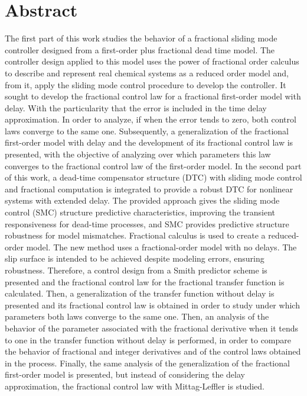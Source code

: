\documentclass[a4paper, 12pt]{report}
\begin{document}
\chapter*{Abstract}

The first part of this work studies the behavior of a fractional sliding mode controller designed from a first-order plus fractional dead time model. The controller design applied to this model uses the power of fractional order calculus to describe and represent real chemical systems as a reduced order model and, from it, apply the sliding mode control procedure to develop the controller. It sought to develop the fractional control law for a fractional first-order model with delay. With the particularity that the error is included in the time delay approximation. In order to analyze, if when the error tends to zero, both control laws converge to the same one. 
Subsequently, a generalization of the fractional first-order model with delay and the development of its fractional control law is presented, with the objective of analyzing over which parameters this law converges to the fractional control law of the first-order model. 
In the second part of this work, a dead-time compensator structure (DTC) with sliding mode control and fractional computation is integrated to provide a robust DTC for nonlinear systems with extended delay. The provided approach gives the sliding mode control (SMC) structure predictive characteristics, improving the transient responsiveness for dead-time processes, and SMC provides predictive structure robustness for model mismatches. Fractional calculus is used to create a reduced-order model. The new method uses a fractional-order model with no delays. The slip surface is intended to be achieved despite modeling errors, ensuring robustness. Therefore, a control design from a Smith predictor scheme is presented and the fractional control law for the fractional transfer function is calculated. Then, a generalization of the transfer function without delay is presented and its fractional control law is obtained in order to study under which parameters both laws converge to the same one. Then, an analysis of the behavior of the parameter associated with the fractional derivative when it tends to one in the transfer function without delay is performed, in order to compare the behavior of fractional and integer derivatives and of the control laws obtained in the process. Finally, the same analysis of the generalization of the fractional first-order model is presented, but instead of considering the delay approximation, the fractional control law with Mittag-Leffler is studied. 
\end{document}
